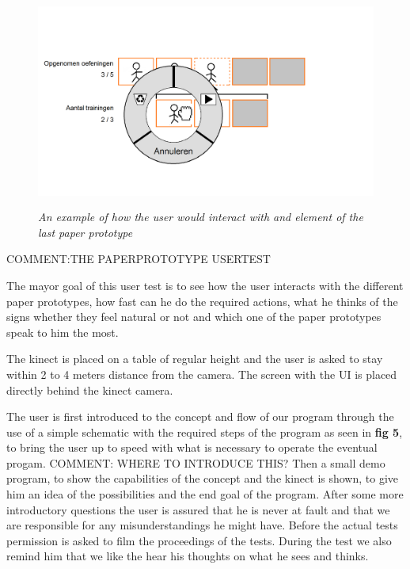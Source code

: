 \begin{figure}[H]
	\begin{center}
		\includegraphics[width=12.5cm, height=7cm]{figures/prototype_10_6_example.png}
		\caption{\emph{An example of how the user would interact with and element of the last paper prototype}}
		\label{An example of how the user would interact with and element of the last paper prototype}
	\end{center}
\end{figure}

{\large COMMENT:THE PAPERPROTOTYPE USERTEST}

The mayor goal of this user test is to see how the user interacts with the different paper prototypes, how fast can he do the required actions, what he thinks of the signs whether they feel natural or not and which one of the paper prototypes speak to him the most. 

The kinect is placed on a table of regular height and the user is asked to stay within 2 to 4 meters distance from the camera. The screen with the UI is placed directly behind the kinect camera.

The user is first introduced to the concept and flow of our program through the use of a simple schematic with the required steps of the program as seen in \textbf{ fig 5}, to bring the user up to speed with what is necessary to operate the eventual progam. {\large COMMENT: WHERE TO INTRODUCE THIS?} Then a small demo program, to show the capabilities of the concept and the kinect is shown, to give him an idea of the possibilities and the end goal of the program. After some more introductory questions the user is assured that he is never at fault and that we are responsible for any misunderstandings he might have. Before the actual tests permission is asked to film the proceedings of the tests. During the test we also remind him that we like the hear his thoughts on what he sees and thinks.\\

